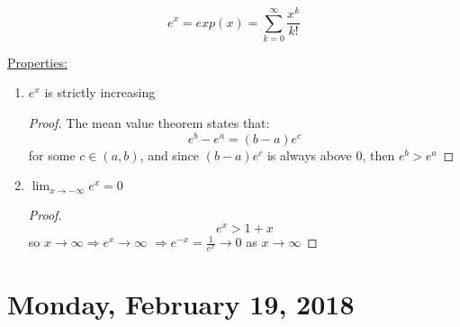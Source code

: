 \documentclass[12pt]{article}
\theoremstyle{plain}
\theoremstyle{definition}
\begin{document}
$$e^x = exp(x) = \sum^\infty_{k=0} \frac{x^k}{k!}$$

\underline{Properties:}
\begin{enumerate}
	\item{
	$e^x$ is strictly increasing
	\begin{proof}
		The mean value theorem states that:
		$$e^b - e^a = (b-a) e^c$$
		for some $c\in (a,b)$, and since $ (b-a) e^c$ is always above 0, then $e^b > e^a$
	\end{proof}

	}
	\item{$\lim_{x\to-\infty} e^x = 0$
	\begin{proof}
		$$e^x > 1+x$$
		so $x\to\infty \Longrightarrow e^x\to\infty$
		$\Longrightarrow e^{-x} = \frac{1}{e^x} \to 0$ as $x\to\infty$
	\end{proof}

	}
\end{enumerate}

\newpage

\section{Monday, February 19, 2018}
\end{document}
